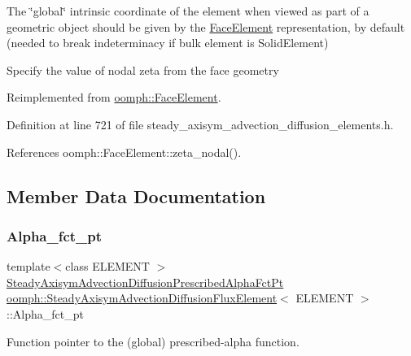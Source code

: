 The \char`\"{}global\char`\"{} intrinsic coordinate of the element when viewed as part of a geometric object should be given by the \hyperlink{classoomph_1_1FaceElement}{Face\+Element} representation, by default (needed to break indeterminacy if bulk element is Solid\+Element) 

Specify the value of nodal zeta from the face geometry 

Reimplemented from \hyperlink{classoomph_1_1FaceElement_a58c9f93705c7741f76c8487d152e68a6}{oomph\+::\+Face\+Element}.



Definition at line 721 of file steady\+\_\+axisym\+\_\+advection\+\_\+diffusion\+\_\+elements.\+h.



References oomph\+::\+Face\+Element\+::zeta\+\_\+nodal().



\subsection{Member Data Documentation}
\mbox{\label{classoomph_1_1SteadyAxisymAdvectionDiffusionFluxElement_a6ecd9c041f8fcecc01dd59c4857d4d5b}} 
\subsubsection{\texorpdfstring{Alpha\+\_\+fct\+\_\+pt}{Alpha\_fct\_pt}}
{\footnotesize\ttfamily template$<$class E\+L\+E\+M\+E\+NT $>$ \\
\hyperlink{classoomph_1_1SteadyAxisymAdvectionDiffusionFluxElement_a28cea997740e6174b3e3583d704229ce}{Steady\+Axisym\+Advection\+Diffusion\+Prescribed\+Alpha\+Fct\+Pt} \hyperlink{classoomph_1_1SteadyAxisymAdvectionDiffusionFluxElement}{oomph\+::\+Steady\+Axisym\+Advection\+Diffusion\+Flux\+Element}$<$ E\+L\+E\+M\+E\+NT $>$\+::Alpha\+\_\+fct\+\_\+pt\hspace{0.3cm}{\ttfamily [private]}}



Function pointer to the (global) prescribed-\/alpha function. 



